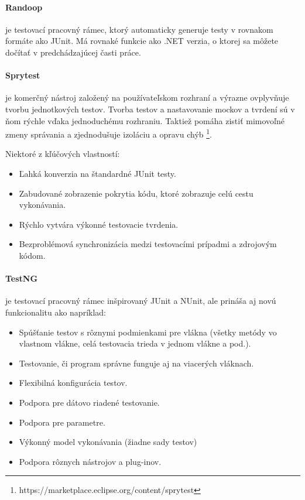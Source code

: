\documentclass[11pt,twoside,slovak,a4paper]{article}
\begin{document}
	\paragraph{Randoop} je testovací pracovný rámec, ktorý automaticky generuje testy v rovnakom formáte ako JUnit. Má rovnaké funkcie ako .NET verzia, o ktorej sa môžete dočítať v predchádzajúcej časti práce.
	
	\paragraph{Sprytest} je komerčný nástroj založený na používateľskom rozhraní a výrazne ovplyvňuje tvorbu jednotkových testov. Tvorba testov a nastavovanie mockov a tvrdení sú v ňom rýchle vďaka jednoduchému rozhraniu. Taktiež pomáha zistiť mimovoľné zmeny správania a zjednodušuje izoláciu a opravu chýb \footnote{https://marketplace.eclipse.org/content/sprytest}.
	
	Niektoré z kľúčových vlastností:
	\begin{itemize}
		\item Ľahká konverzia na štandardné JUnit testy.
		\item Zabudované zobrazenie pokrytia kódu, ktoré zobrazuje celú cestu vykonávania.
		\item Rýchlo vytvára výkonné testovacie tvrdenia.
		\item Bezproblémová synchronizácia medzi testovacími prípadmi a zdrojovým kódom.
	\end{itemize}
	
	\paragraph{TestNG} je testovací pracovný rámec inšpirovaný JUnit a NUnit, ale prináša aj novú funkcionalitu ako napríklad:
	\begin{itemize}
		\item Spúšťanie testov s rôznymi podmienkami pre vlákna (všetky metódy vo vlastnom vlákne, celá testovacia trieda v jednom vlákne a pod.).
		\item Testovanie, či program správne funguje aj na viacerých vláknach.
		\item Flexibilná konfigurácia testov.
		\item Podpora pre dátovo riadené testovanie.
		\item Podpora pre parametre.
		\item Výkonný model vykonávania (žiadne sady testov)
		\item Podpora rôznych nástrojov a plug-inov.
	\end{itemize}
	
\end{document}
